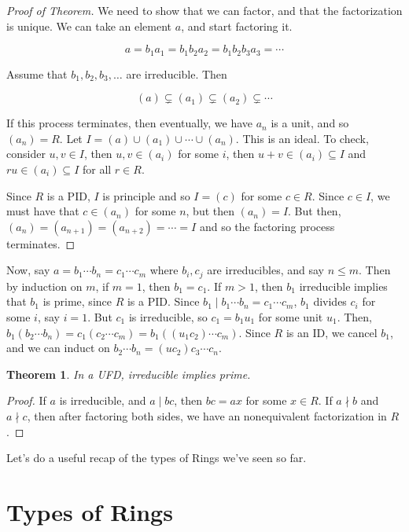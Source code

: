\documentclass[12pt]{article}
\newtheorem{theorem}{Theorem}
\theoremstyle{remark}
\theoremstyle{remark}
\theoremstyle{remark}
\theoremstyle{remark}
\theoremstyle{remark}
\begin{document}
\begin{proof}[Proof of Theorem]
  We need to show that we can factor, and that the factorization is unique. We
  can take an element $a$, and start factoring it.

  \[
    a = b_1 a_1 = b_1 b_2 a_2 = b_1 b_2 b_3 a_3 = \cdots
  \]

  Assume that $b_1, b_2, b_3, \dots$ are irreducible. Then 

  \[
    (a) \subsetneq (a_1) \subsetneq (a_2) \subsetneq \cdots
  \]

  If this process terminates, then eventually, we have $a_n$ is a unit, and so
  $(a_n) = R$. Let $I = (a) \cup (a_1) \cup \cdots \cup (a_n)$. This is an
  ideal. To check, consider $u, v \in I$, then $u, v \in (a_i)$ for some $i$,
  then $u + v \in (a_i) \subseteq I$ and $ru \in (a_i) \subseteq I$ for all $r
  \in R$.

  Since $R$ is a PID, $I$ is principle and so $I = (c)$ for some $c \in R$.
  Since $c \in I$, we must have that $c \in (a_n)$ for some $n$, but then $(a_n)
  = I$. But then, $(a_n) = (a_{n + 1}) = (a_{n + 2}) = \cdots = I$ and so the
  factoring process terminates.
\end{proof}

Now, say $a = b_1 \cdots b_n = c_1 \cdots c_m$ where $b_i, c_j$ are
irreducibles, and say $n \le m$. Then by induction on $m$, if $m = 1$, then $b_1
= c_1$. If $m > 1$, then $b_1$ irreducible implies that $b_1$ is prime, since
$R$ is a PID. Since $b_1 \mid b_1 \cdots b_n = c_1 \cdots c_m$, $b_1$ divides
$c_i$ for some $i$, say $i = 1$. But $c_1$ is irreducible, so $c_1 = b_1 u_1$
for some unit $u_1$. Then, $b_1(b_2 \cdots b_n) = c_1 (c_2 \cdots c_m) = b_1
((u_1 c_2) \cdots c_m)$. Since $R$ is an ID, we cancel $b_1$, and we can induct
on $b_2 \cdots b_n = (u c_2) c_3 \cdots c_n$.

\begin{theorem}
  In a UFD, irreducible implies prime.
\end{theorem}
\begin{proof}
  If $a$ is irreducible, and $a \mid bc$, then $bc = ax$ for some $x \in R$. If
  $a \nmid b$ and $a \nmid c$, then after factoring both sides, we have an
  nonequivalent factorization in $R$.
\end{proof}

Let's do a useful recap of the types of Rings we've seen so far.

\section{Types of Rings}
\end{document}
